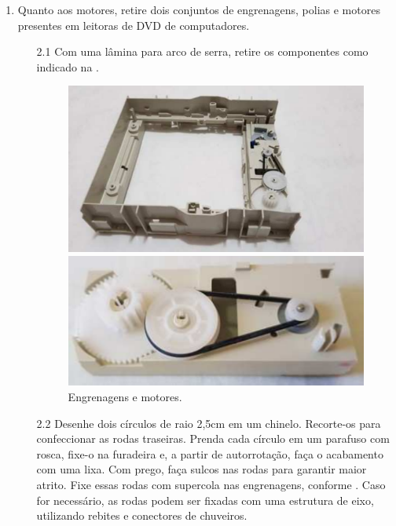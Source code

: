 \documentclass{textolivre}
\begin{document}
\begin{enumerate}
\begin{enumerate}
    \end{enumerate}

    \item Quanto aos motores, retire dois conjuntos de engrenagens, polias e motores presentes em leitoras de DVD de computadores.
    \begin{enumerate}
    \item[2.1] Com uma lâmina para arco de serra, retire os componentes como indicado na .

    \begin{figure}[h!]
    \begin{minipage}{0.47\textwidth}
    \includegraphics[width=\linewidth]{figure-03.pdf}
    \subcaption{}
    \end{minipage}
    \hfill
    \begin{minipage}{0.47\textwidth} 
    \includegraphics[width=\linewidth]{figure-04.pdf}
    \subcaption{}
    \end{minipage}
    \caption{Engrenagens e motores.}
    \label{fig02}
    \end{figure}
    
    \item[2.2] Desenhe dois círculos de raio 2,5cm em um chinelo. Recorte-os para
    confeccionar as rodas traseiras. Prenda cada círculo em um parafuso com
    rosca, fixe-o na furadeira e, a partir de autorrotação, faça o acabamento
    com uma lixa. Com prego, faça sulcos nas rodas para garantir maior atrito.
    Fixe essas rodas com supercola nas engrenagens, conforme . Caso for
    necessário, as rodas podem ser fixadas com uma estrutura de eixo,
    utilizando rebites e conectores de chuveiros.


\end{enumerate}
\end{enumerate}
\end{document}
